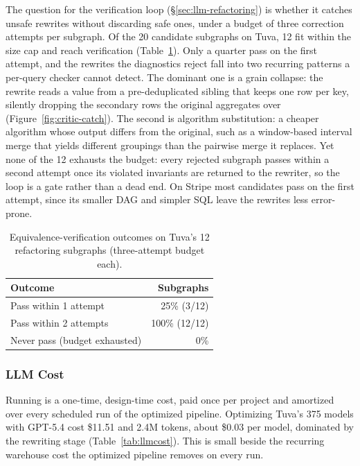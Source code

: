 The question for the verification loop (\S\ref{sec:llm-refactoring}) is whether it catches unsafe rewrites without discarding safe ones, under a budget of three correction attempts per subgraph. Of the 20 candidate subgraphs on Tuva, 12 fit within the size cap and reach verification (Table~\ref{tab:verification}). Only a quarter pass on the first attempt, and the rewrites the diagnostics reject fall into two recurring patterns a per-query checker cannot detect. The dominant one is a grain collapse: the rewrite reads a value from a pre-deduplicated sibling that keeps one row per key, silently dropping the secondary rows the original aggregates over (Figure~\ref{fig:critic-catch}). The second is algorithm substitution: a cheaper algorithm whose output differs from the original, such as a window-based interval merge that yields different groupings than the pairwise merge it replaces. Yet none of the 12 exhausts the budget: every rejected subgraph passes within a second attempt once its violated invariants are returned to the rewriter, so the loop is a gate rather than a dead end. On Stripe most candidates pass on the first attempt, since its smaller DAG and simpler SQL leave the rewrites less error-prone.

\begin{table}[tb]
\centering
\caption{Equivalence-verification outcomes on Tuva's 12 refactoring subgraphs (three-attempt budget each).}
\inv
\label{tab:verification}
\small
\begin{tabular}{lr}
\toprule
Outcome & Subgraphs \\
\midrule
Pass within 1 attempt        & 25\% (3/12) \\
Pass within 2 attempts       & 100\% (12/12) \\
Never pass (budget exhausted) & 0\% \\
\bottomrule
\end{tabular}
\inv
\end{table}

\subsubsection{LLM Cost}
\label{sec:eval-llm-cost}

Running \tool{} is a one-time, design-time cost, paid once per project and amortized over every scheduled run of the optimized pipeline. Optimizing Tuva's 375 models with GPT-5.4 cost \$11.51 and 2.4M tokens, about \$0.03 per model, dominated by the rewriting stage (Table~\ref{tab:llmcost}). This is small beside the recurring warehouse cost the optimized pipeline removes on every run.


